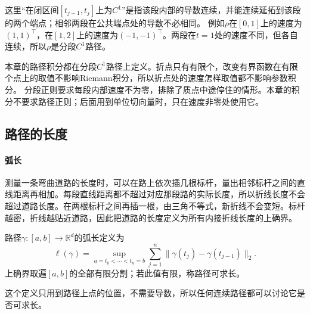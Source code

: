 这里“在闭区间$[t_{j-1},t_j]$上为$C^1$”是指该段内部的导数连续，并能连续延拓到该段的两个端点；相邻两段在公共端点处的导数不必相同。
例如$\rho$在$[0,1]$上的速度为$(1,1)^\top$，在$[1,2]$上的速度为$(-1,-1)^\top$。两段在$t=1$处的速度不同，但各自连续，所以$\rho$是分段$C^1$路径。

本章的路径积分都在分段$C^1$路径上定义。折点只有有限个，改变有界函数在有限个点上的取值不影响Riemann积分，所以折点处的速度怎样取值都不影响参数积分。
分段正则要求每段内部速度不为零，排除了质点中途停住的情形。本章的积分不要求路径正则；后面用到单位切向量时，只在速度非零处使用它。

\subsection{路径的长度}

\paragraph{弧长}

测量一条弯曲道路的长度时，可以在路上依次插几根标杆，量出相邻标杆之间的直线距离再相加。每段直线距离都不超过对应那段路的实际长度，所以折线长度不会超过道路长度。在两根标杆之间再插一根，由三角不等式，新折线不会变短。标杆越密，折线越贴近道路，因此把道路的长度定义为所有内接折线长度的上确界。
\begin{definition}[路径的弧长]
路径$\gamma:[a,b]\to\mathbb R^d$的弧长定义为
\[
 \ell(\gamma)=\sup_{a=t_0<\cdots<t_n=b}
 \sum_{j=1}^n\lVert\gamma(t_j)-\gamma(t_{j-1})\rVert_2.
\]
上确界取遍$[a,b]$的全部有限分割；若此值有限，称路径可求长。
\end{definition}

这个定义只用到路径上点的位置，不需要导数，所以任何连续路径都可以讨论它是否可求长。

